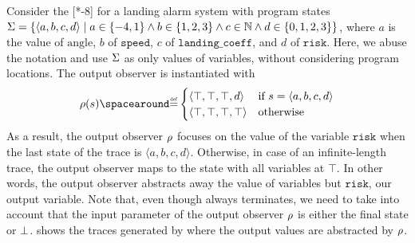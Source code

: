 \begin{example}
  Consider the [*-8] for a landing alarm system with program states $\Sigma=\{\langle a, b, c, d \rangle \mid a\in\{-4,1\}\land b\in\{1,2,3\}\land c\in\mathbb{N} \land d\in\{0,1,2,3\}\}$, where $a$ is the value of $\text{angle}$, $b$ of $\texttt{speed}$, $c$ of $\texttt{landing\_coeff}$, and $d$ of $\texttt{risk}$.
  Here, we abuse the notation and use $\Sigma$ as only values of variables, without considering program locations.
  The output observer is instantiated with
  \[
  \outputobs(\defstate) \DefeQ \begin{cases}
    \langle \top, \top, \top, d \rangle & \text{if } \defstate = \langle a, b, c, d \rangle \\
    \langle \top, \top, \top, \top \rangle & \text{otherwise}
  \end{cases}
  \]
  As a result, the output observer $\rho$ focuses on the value of the variable $\texttt{risk}$ when the last state of the trace is $\langle a, b, c, d \rangle$. Otherwise, in case of an infinite-length trace, the output observer maps to the state with all variables at $\top$.
  In other words, the output observer abstracts away the value of variables but $\texttt{risk}$, our output variable.
  Note that, even though  always terminates, we need to take into account that the input parameter of the output observer $\rho$ is either the final state or $\bot$.
   shows the traces generated by  where the output values are abstracted by $\rho$.
\end{example}
